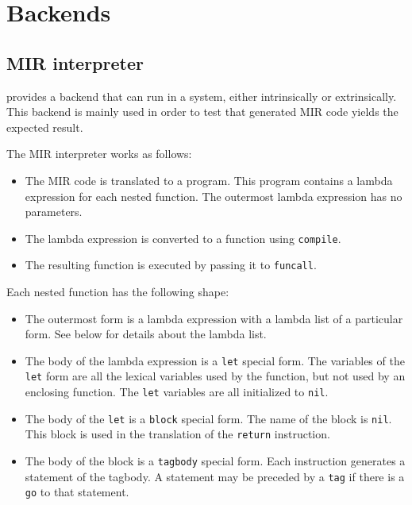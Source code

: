 \chapter{Backends}

\section{MIR interpreter}

\sysname{} provides a backend that can run in a \commonlisp{} system,
either intrinsically or extrinsically.  This backend is mainly used
in order to test that generated MIR code yields the expected result. 

The MIR interpreter works as follows:

\begin{itemize}
\item The MIR code is translated to a \commonlisp{} program.  This
  program contains a lambda expression for each nested function.  The
  outermost lambda expression has no parameters.
\item The lambda expression is converted to a function using
  \texttt{compile}. 
\item The resulting function is executed by passing it to
  \texttt{funcall}. 
\end{itemize}

Each nested function has the following shape:

\begin{itemize}
\item The outermost form is a lambda expression with a lambda list of
  a particular form.  See below for details about the lambda list.
\item The body of the lambda expression is a \texttt{let} special
  form.  The variables of the \texttt{let} form are all the lexical
  variables used by the function, but not used by an enclosing
  function.  The \texttt{let} variables are all initialized to
  \texttt{nil}. 
\item The body of the \texttt{let} is a \texttt{block} special form.
  The name of the block is \texttt{nil}.  This block is used in the
  translation of the \texttt{return} instruction.  
\item The body of the block is a \texttt{tagbody} special form.  Each
  instruction generates a statement of the tagbody.  A statement may
  be preceded by a \texttt{tag} if there is a \texttt{go} to that
  statement. 
\end{itemize}

